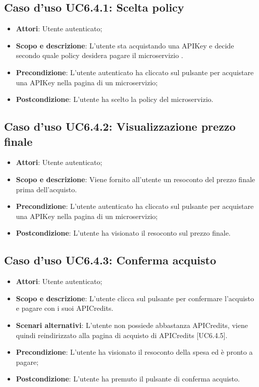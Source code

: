 \documentclass[12pt,a4paper,titlepage]{article}
\begin{document}
	\subsection{Caso d'uso UC6.4.1: Scelta policy}
	\label{UC6.4.1}
	\begin{itemize}
		\item \textbf{Attori}: Utente autenticato;
		\item \textbf{Scopo e descrizione}: L'utente sta acquistando una APIKey e decide secondo quale policy desidera pagare il microservizio .
		\item \textbf{Precondizione}: L'utente autenticato ha cliccato sul pulsante per acquistare una APIKey nella pagina di un microservizio;
		\item \textbf{Postcondizione}: L'utente ha scelto la policy del microservizio.
	\end{itemize}
	\subsection{Caso d'uso UC6.4.2: Visualizzazione prezzo finale}
	\label{UC6.4.2}
	\begin{itemize}
		\item \textbf{Attori}: Utente autenticato;
		\item \textbf{Scopo e descrizione}: Viene fornito all'utente un resoconto del prezzo finale prima dell'acquisto. 
		\item \textbf{Precondizione}: L'utente autenticato ha cliccato sul pulsante per acquistare una APIKey nella pagina di un microservizio;
		\item \textbf{Postcondizione}: L'utente ha visionato il resoconto sul prezzo finale.
	\end{itemize}
	\subsection{Caso d'uso UC6.4.3: Conferma acquisto}
	\label{UC6.4.3}
	\begin{itemize}
		\item \textbf{Attori}: Utente autenticato;
		\item \textbf{Scopo e descrizione}: L'utente clicca sul pulsante per confermare l'acquisto e pagare con i suoi APICredits.
		\item \textbf{Scenari alternativi}:
		L'utente non possiede abbastanza APICredits, viene quindi reindirizzato alla pagina di acquisto di APICredits [UC6.4.5].
		\item \textbf{Precondizione}: L'utente ha visionato il resoconto della spesa ed è pronto a pagare;
		\item \textbf{Postcondizione}: L'utente ha premuto il pulsante di conferma acquisto.
	\end{itemize}
\end{document}
